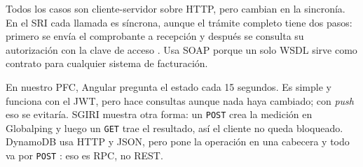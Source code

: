 Todos los casos son cliente-servidor sobre HTTP, pero cambian en la sincronía. En el SRI cada llamada es síncrona, aunque el trámite completo tiene dos pasos: primero se envía el comprobante a recepción y después se consulta su autorización con la clave de acceso \cite{sri_recepcion,sri_autorizacion}. Usa SOAP porque un solo WSDL sirve como contrato para cualquier sistema de facturación.

En nuestro PFC, Angular pregunta el estado cada 15 segundos. Es simple y funciona con el JWT, pero hace consultas aunque nada haya cambiado; con \emph{push} eso se evitaría. SGIRI muestra otra forma: un \texttt{POST} crea la medición en Globalping y luego un \texttt{GET} trae el resultado, así el cliente no queda bloqueado. DynamoDB usa HTTP y JSON, pero pone la operación en una cabecera y todo va por \texttt{POST} \cite{aws_dynamodb_api}: eso es RPC, no REST.
